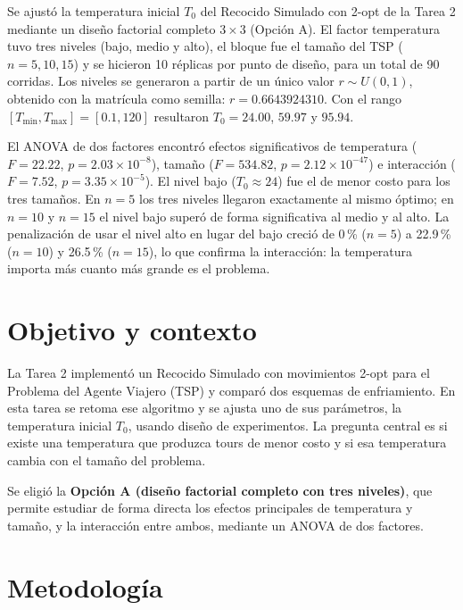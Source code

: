 \documentclass[11pt,letterpaper]{article}
\begin{document}
Se ajustó la temperatura inicial $T_0$ del Recocido Simulado con 2-opt de la
Tarea 2 mediante un diseño factorial completo $3 \times 3$ (Opción A). El
factor temperatura tuvo tres niveles (bajo, medio y alto), el bloque fue el
tamaño del TSP ($n = 5, 10, 15$) y se hicieron 10 réplicas por punto de
diseño, para un total de 90 corridas. Los niveles se generaron a partir de un
único valor $r \sim U(0,1)$, obtenido con la matrícula como
semilla: $r = 0.6643924310$. Con el rango $[T_{\min}, T_{\max}] = [0.1, 120]$
resultaron $T_0 = 24.00$, $59.97$ y $95.94$.

El ANOVA de dos factores encontró efectos significativos de temperatura
($F = 22.22$, $p = 2.03\times10^{-8}$), tamaño ($F = 534.82$,
$p = 2.12\times10^{-47}$) e interacción ($F = 7.52$,
$p = 3.35\times10^{-5}$). El nivel bajo ($T_0 \approx 24$) fue el de menor
costo para los tres tamaños. En $n = 5$ los tres niveles llegaron exactamente
al mismo óptimo; en $n = 10$ y $n = 15$ el nivel bajo superó de forma
significativa al medio y al alto. La penalización de usar el nivel alto en
lugar del bajo creció de 0\,\% ($n = 5$) a 22.9\,\% ($n = 10$) y 26.5\,\%
($n = 15$), lo que confirma la interacción: la temperatura importa más cuanto
más grande es el problema.

\section{Objetivo y contexto}

La Tarea 2 implementó un Recocido Simulado con movimientos 2-opt para el
Problema del Agente Viajero (TSP) y comparó dos esquemas de enfriamiento. En
esta tarea se retoma ese algoritmo y se ajusta uno de sus parámetros, la
temperatura inicial $T_0$, usando diseño de experimentos. La pregunta central
es si existe una temperatura que produzca tours de menor costo y si esa
temperatura cambia con el tamaño del problema.

Se eligió la \textbf{Opción A (diseño factorial completo con tres niveles)},
que permite estudiar de forma directa los efectos principales de temperatura y
tamaño, y la interacción entre ambos, mediante un ANOVA de dos factores.

\section{Metodología}
\end{document}
